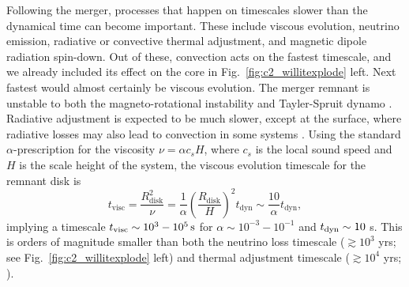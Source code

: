 Following the merger, processes that happen on timescales slower than the dynamical time can become important.  These include viscous evolution, neutrino emission, radiative or convective thermal adjustment, and magnetic dipole radiation spin-down.  Out of these, convection acts on the fastest timescale, and we already included its effect on the core in Fig.~\ref{fig:c2_willitexplode} left.  Next fastest would almost certainly be viscous evolution.  The merger remnant is unstable to both the magneto-rotational instability \citep{balbh91} and Tayler-Spruit dynamo \citep{spru02}.  Radiative adjustment is expected to be much slower, except at the surface, where radiative losses may also lead to convection in some systems \citep{shen+12,schw+12,rask+12}.  Using the standard \cite{shaks73} $\alpha$-prescription for the viscosity $\nu = \alpha c_s H$, where $c_s$ is the local sound speed and $H$ is the scale height of the system, the viscous evolution timescale for the remnant disk is
\begin{equation}
t_\mathrm{visc} = \frac{R_\mathrm{disk}^2}{\nu} = \frac{1}{\alpha}\left(\frac{R_\mathrm{disk}}{H}\right)^2t_\mathrm{dyn} \sim \frac{10}{\alpha}t_\mathrm{dyn},
\end{equation}
implying a timescale $t_{\rm visc}\sim10^3-10^5{\rm\,s}$ for $\alpha\sim10^{-3}-10^{-1}$ and $t_\mathrm{dyn} \sim 10$ s.  This is orders of magnitude smaller than both the neutrino loss timescale ($\gtrsim\!10^3$ yrs; see Fig.~\ref{fig:c2_willitexplode} left) and thermal adjustment timescale ($\gtrsim\!10^4$ yrs; \citealt{shen+12}).

